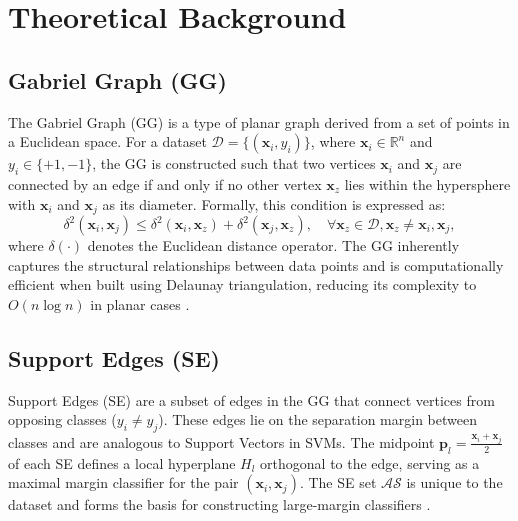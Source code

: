 \documentclass[conference]{IEEEtran}
\begin{document}
\section{Theoretical Background}
\subsection{Gabriel Graph (GG)}
The Gabriel Graph (GG) is a type of planar graph derived from a set of points in a Euclidean space. For a dataset \(\mathcal{D} = \{(\mathbf{x}_i, y_i)\}\), where \(\mathbf{x}_i \in \mathbb{R}^n\) and \(y_i \in \{+1, -1\}\), the GG is constructed such that two vertices \(\mathbf{x}_i\) and \(\mathbf{x}_j\) are connected by an edge if and only if no other vertex \(\mathbf{x}_z\) lies within the hypersphere with \(\mathbf{x}_i\) and \(\mathbf{x}_j\) as its diameter. Formally, this condition is expressed as:
\[
\delta^2(\mathbf{x}_i, \mathbf{x}_j) \leq \delta^2(\mathbf{x}_i, \mathbf{x}_z) + \delta^2(\mathbf{x}_j, \mathbf{x}_z), \quad \forall \mathbf{x}_z \in \mathcal{D}, \mathbf{x}_z \neq \mathbf{x}_i, \mathbf{x}_j,
\]
where \(\delta(\cdot)\) denotes the Euclidean distance operator. The GG inherently captures the structural relationships between data points and is computationally efficient when built using Delaunay triangulation, reducing its complexity to \(O(n \log n)\) in planar cases \cite{arias2021, torres2015b}.

\subsection{Support Edges (SE)}
Support Edges (SE) are a subset of edges in the GG that connect vertices from opposing classes (\(y_i \neq y_j\)). These edges lie on the separation margin between classes and are analogous to Support Vectors in SVMs. The midpoint \(\mathbf{p}_l = \frac{\mathbf{x}_i + \mathbf{x}_j}{2}\) of each SE defines a local hyperplane \(H_l\) orthogonal to the edge, serving as a maximal margin classifier for the pair \((\mathbf{x}_i, \mathbf{x}_j)\). The SE set \(\mathcal{AS}\) is unique to the dataset and forms the basis for constructing large-margin classifiers \cite{torres2016, torres2015b}.
\end{document}
